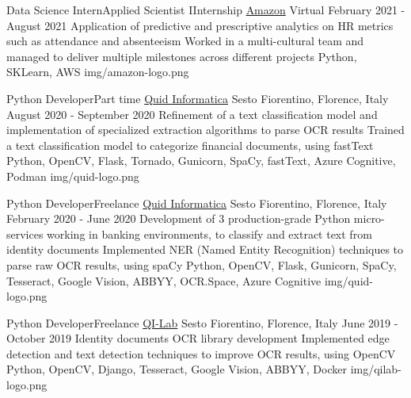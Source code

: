 
\begin{cventries}

  \logocventry
    {Data Science Intern{\enskip\cdotp\enskip}Applied Scientist I{\enskip\cdotp\enskip}Internship}
    {\href{https://www.amazon.com/}{Amazon}}
    {Virtual}
    {February 2021 - August 2021}
    {
      \cvexp
        {Application of predictive and prescriptive analytics on HR metrics such as attendance and absenteeism}
        {Worked in a multi-cultural team and managed to deliver multiple milestones across different projects}
        {Python, SKLearn, AWS}
    }
    {img/amazon-logo.png}

  \logocventry
    {Python Developer{\enskip\cdotp\enskip}Part time}
    {\href{https://www.quidinfo.it/}{Quid Informatica}}
    {Sesto Fiorentino, Florence, Italy}
    {August 2020 - September 2020}
    {
      \cvexp
        {Refinement of a text classification model and implementation of specialized extraction algorithms to parse OCR results}
        {Trained a text classification model to categorize financial documents, using fastText}
        {Python, OpenCV, Flask, Tornado, Gunicorn, SpaCy, fastText, Azure Cognitive, Podman}
    }
    {img/quid-logo.png}

  \logocventry
    {Python Developer{\enskip\cdotp\enskip}Freelance}
    {\href{https://www.quidinfo.it/}{Quid Informatica}}
    {Sesto Fiorentino, Florence, Italy}
    {February 2020 - June 2020}
    {
      \cvexp
        {Development of 3 production-grade Python micro-services working in banking environments, to classify and extract text from identity documents}
        {Implemented NER (Named Entity Recognition) techniques to parse raw OCR results, using spaCy}
        {Python, OpenCV, Flask, Gunicorn, SpaCy, Tesseract, Google Vision, ABBYY, OCR.Space, Azure Cognitive}
    }
    {img/quid-logo.png}

  \logocventry
    {Python Developer{\enskip\cdotp\enskip}Freelance}
    {\href{https://www.qi-lab.it/}{QI-Lab}}
    {Sesto Fiorentino, Florence, Italy}
    {June 2019 - October 2019}
    {
      \cvexp
        {Identity documents OCR library development}
        {Implemented edge detection and text detection techniques to improve OCR results, using OpenCV}
        {Python, OpenCV, Django, Tesseract, Google Vision, ABBYY, Docker}
    }
    {img/qilab-logo.png}
  

\end{cventries}

